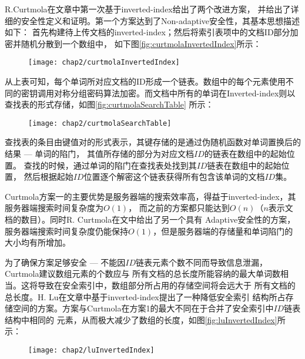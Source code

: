 R.Curtmola在文章\cite{curtmola2006searchable}中第一次基于inverted-index给出了两个改进方案，
并给出了详细的安全性定义和证明。第一个方案达到了Non-adaptive安全性，其基本思想描述如下：
首先构建待上传文档的inverted-index；然后将索引表项中的文档ID部分加密并随机分散到一个数组中，
如下图\ref{fig:curtmolaInvertedIndex}所示：

\begin{figure}[!htp]
  \centering
  \texttt{[image: chap2/curtmolaInvertedIndex]}
\end{figure}

从上表可知，每个单词所对应文档的ID形成一个链表。数组中的每个元素使用不同的密钥调用对称分组密码算法加密。而文档中所有的单词在Inverted-index则以查找表的形式存储，如图\ref{fig:curtmolaSearchTable} 所示：
\begin{figure}[!htp]
  \centering
  \texttt{[image: chap2/curtmolaSearchTable]}
\end{figure}


查找表的条目由键值对的形式表示，其键存储的是通过伪随机函数对单词置换后的结果 --- 单词的陷门，
其值所存储的部分为对应文档$ID$的链表在数组中的起始位置。
查找的时候，通过单词的陷门在查找表处找到其$ID$链表在数组中的起始位置，
然后根据起始$ID$位置逐个解密这个链表获得所有包含该单词的文档$ID$集。

Curtmola方案一的主要优势是服务器端的搜索效率高，得益于inverted-index，其服务器端搜索时间复杂度为$O(1)$，
而之前的方案都只能达到$O(n)$（$n$表示文档的数目）。同时R. Curtmola在文中给出了另一个具有
Adaptive安全性的方案，服务器端搜索时间复杂度仍能保持$O(1)$，但是服务器端的存储量和单词陷门的大小均有所增加。

为了确保方案足够安全 --- 不能因$ID$链表元素个数不同而导致信息泄漏，Curtmola建议数组元素的个数应与
所有文档的总长度所能容纳的最大单词数相当。这将导致在安全索引中，数组部分所占用的存储空间将会远大于
所有文档的总长度。H. Lu在文章\cite{jin2012reducing}中基于inverted-index提出了一种降低安全索引
结构所占存储空间的方案。方案与Curtmola在方案1的最大不同在于合并了安全索引中$ID$链表结构中相同的
元素，从而极大减少了数组的长度，如图\ref{fig:luInvertedIndex}所示：
\begin{figure}[!htp]
  \centering
  \texttt{[image: chap2/luInvertedIndex]}
\end{figure}

